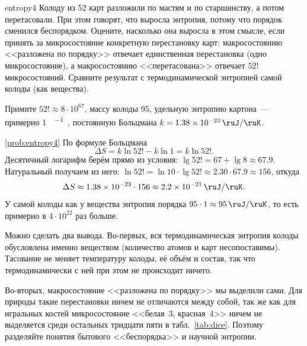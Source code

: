 \begin{problem}{}{entropy4}
    Колоду из 52 карт разложили по мастям и по старшинству, а потом перетасовали. При этом говорят, что выросла энтропия, потому что порядок сменился беспорядком. Оцените, насколько она выросла в этом смысле, если принять за микросостояние конкретную перестановку карт: макросостоянию <<разложена по порядку>> отвечает единственная перестановка (одно микросостояние), а макросостоянию <<перетасована>> отвечает $52!$ микросостояний. Сравните результат с термодинамической энтропией самой колоды (как вещества).

    Примите $52! \approx 8 \cdot 10^{67}$, массу колоды \qty{95}{\ruG}, удельную энтропию картона~--- примерно \qty{1}{\ruJ\per\ruG\ruK}, постоянную Больцмана $k = \qty{1,38e-23}{\ruJ\per\ruK}$.
    \begin{sol}{\ref{prob:entropy4}}
        По формуле Больцмана
        \begin{equation*}
            \Delta S = k \ln 52! - k \ln 1 = k \ln 52!.
        \end{equation*}
        Десятичный логарифм берём прямо из условия: $\lg 52! = 67 + \lg 8 \approx \num{67,9}$. Натуральный получаем из него: $\ln 52! = \ln 10 \cdot \lg 52! \approx \num{2,30} \cdot \num{67,9} \approx \num{156}$, откуда
        \begin{equation*}
            \Delta S \approx \num{1,38e-23} \cdot \num{156} \approx \qty{2,2e-21}{\ruJ\per\ruK}.
        \end{equation*}
        У самой колоды как у вещества энтропия порядка $\num{95} \cdot \num{1} \approx \qty{95}{\ruJ\per\ruK}$, то есть примерно в $4 \cdot 10^{22}$ раз больше.

        Можно сделать два вывода. Во-первых, вся термодинамическая энтропия колоды обусловлена именно веществом (количество атомов и карт несопоставимы). Тасование не меняет температуру колоды, её объём и состав, так что термодинамически с ней при этом не происходит ничего.

        Во-вторых, макросостояние <<разложена по порядку>> мы выделили сами. Для природы такие перестановки ничем не отличаются между собой, так же как для игральных костей микросостояние <<белая~3, красная~4>> ничем не выделяется среди остальных тридцати пяти в табл.~\ref{tab:dice}. Поэтому разделяйте понятия бытового <<беспорядка>> и научной энтропии.
    \end{sol}
\end{problem}

